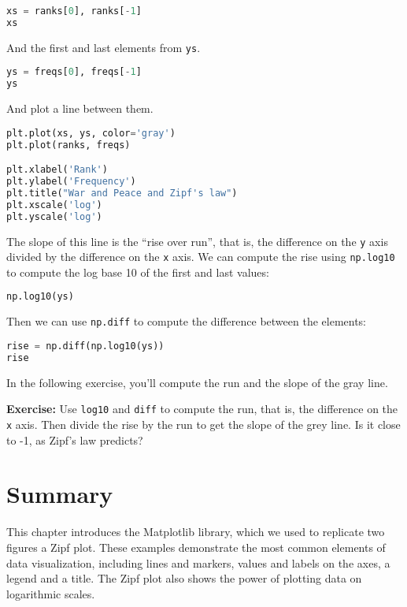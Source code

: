 \begin{lstlisting}[language=Python,style=source]
xs = ranks[0], ranks[-1]
xs
\end{lstlisting}

And the first and last elements from \passthrough{\lstinline!ys!}.

\begin{lstlisting}[language=Python,style=source]
ys = freqs[0], freqs[-1]
ys
\end{lstlisting}

And plot a line between them.

\begin{lstlisting}[language=Python,style=source]
plt.plot(xs, ys, color='gray')
plt.plot(ranks, freqs)

plt.xlabel('Rank')
plt.ylabel('Frequency')
plt.title("War and Peace and Zipf's law")
plt.xscale('log')
plt.yscale('log')
\end{lstlisting}

The slope of this line is the ``rise over run'', that is, the difference
on the \passthrough{\lstinline!y!} axis divided by the difference on the
\passthrough{\lstinline!x!} axis. We can compute the rise using
\passthrough{\lstinline!np.log10!} to compute the log base 10 of the
first and last values:

\begin{lstlisting}[language=Python,style=source]
np.log10(ys)
\end{lstlisting}

Then we can use \passthrough{\lstinline!np.diff!} to compute the
difference between the elements:

\begin{lstlisting}[language=Python,style=source]
rise = np.diff(np.log10(ys))
rise
\end{lstlisting}

In the following exercise, you'll compute the run and the slope of the
gray line.

\textbf{Exercise:} Use \passthrough{\lstinline!log10!} and
\passthrough{\lstinline!diff!} to compute the run, that is, the
difference on the \passthrough{\lstinline!x!} axis. Then divide the rise
by the run to get the slope of the grey line. Is it close to -1, as
Zipf's law predicts?

\hypertarget{summary}{%
\section{Summary}\label{summary}}

This chapter introduces the Matplotlib library, which we used to
replicate two figures a Zipf plot. These examples demonstrate the most
common elements of data visualization, including lines and markers,
values and labels on the axes, a legend and a title. The Zipf plot also
shows the power of plotting data on logarithmic scales.

